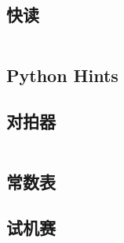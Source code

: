 \documentclass[12pt, a4paper, oneside]{ctexart}
\begin{document}
\begin{multicols}{2}
        \subsection{快读}
        \inputminted{cpp}{src/tools/fastio.cpp}
        \subsection{Python Hints}
        
        \subsection{对拍器}
        \inputminted{python3}{src/tools/llx_checker.py}
        \subsection{常数表}
        
        \subsection{试机赛}
        
    \end{multicols}
\end{document}
